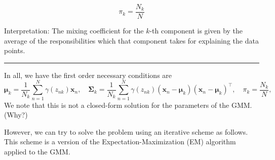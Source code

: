\documentclass[11pt]{article}
\theoremstyle{plain} %
\newenvironment{topic}
{\color{C2}\normalfont\begin{framed}\begingroup }
  {\endgroup\end{framed}}
\theoremstyle{remark}
\begin{document}
\begin{topic}
$$
  \pi_{k}=\frac{N_{k}}{N}
$$

Interpretation: The mixing coefficient for the $k$-th component is given by the average
of the responsibilities which that component takes for explaining the data
points.
\vspace{1em}

\hrule

In all, we have the first order necessary conditions are
$$
  \boldsymbol{\mu}_{k}=\frac{1}{N_{k}} \sum_{n=1}^{N} \gamma\left(z_{n k}\right) \mathbf{x}_{n}, \quad
  \boldsymbol{\Sigma}_{k}=\frac{1}{N_{k}} \sum_{n=1}^{N} \gamma\left(z_{n k}\right)\left(\mathbf{x}_{n}-\boldsymbol{\mu}_{k}\right)\left(\mathbf{x}_{n}-\boldsymbol{\mu}_{k}\right)^\top, \quad
  \pi_{k}=\frac{N_{k}}{N},
$$
We note that this is not a closed-form solution for the
parameters of the GMM. (Why?)

However, we can try to solve the problem using an iterative scheme as follows.
This scheme is a version of the Expectation-Maximization (EM) algorithm applied
to the GMM.



\end{topic}
\end{document}
